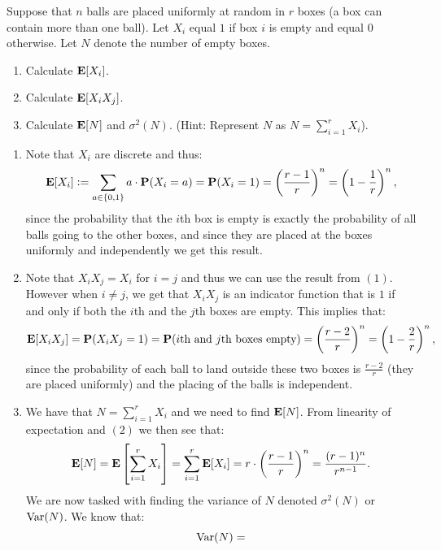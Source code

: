 \documentclass[11pt,a4paper]{article}
\begin{document}
\begin{exercise}
  Suppose that $n$ balls are placed uniformly at random in $r$ boxes
  (a box can contain more than one ball).
  Let $X_i$ equal $1$ if box $i$ is empty and equal $0$ otherwise.
  Let $N$ denote the number of empty boxes.
  \begin{enumerate}
    \item[(1)] Calculate $\mathbf{E}[X_i]$.
    \item[(2)] Calculate $\mathbf{E}[X_i X_j]$.
    \item[(3)] Calculate $\mathbf{E}[N]$ and $\sigma^2(N)$.
      (Hint: Represent $N$ as $N = \sum_{i=1}^{r} X_i$).
  \end{enumerate}
\end{exercise}
\begin{solution} \phantom{}
  \begin{enumerate}
    \item[(1)] Note that $X_i$ are discrete and thus:
      \[
        \E[X_i] :=
        \sum_{a \in \set{0,1}} a \cdot \Prob(X_i = a) =
        \Prob(X_i = 1) =
        \del{\frac{r - 1}{r}}^n =
        \del{1 - \frac{1}{r}}^n,
      \]
      since the probability that the $i$th box is empty is exactly
      the probability of all balls going to the other boxes,
      and since they are placed at the boxes uniformly and independently
      we get this result.
    \item[(2)] Note that $X_i X_j = X_i$ for $i = j$
      and thus we can use the result from $(1)$.
      However when $i \neq j$, we get that $X_i X_j$ is an indicator
      function that is $1$ if and only if both the $i$th and the $j$th
      boxes are empty.
      This implies that:
      \[
        \E[X_i X_j] = \Prob(X_i X_j = 1) = \Prob(\text{$i$th and $j$th boxes
        empty}) = 
        \del{\frac{r - 2}{r}}^n =
        \del{1 - \frac{2}{r}}^n,
      \]
      since the probability of each ball to land outside these two boxes
      is $\frac{r - 2}{r}$ (they are placed uniformly) and the placing
      of the balls is independent.
    \item[(3)] We have that $N = \sum_{i=1}^{r} X_i$
      and we need to find $\mathbf{E}[N]$.
      From linearity of expectation and $(2)$ we then see that:
      \[
        \E[N] =
        \E\left[\sum_{i=1}^{r} X_i\right] =
        \sum_{i=1}^{r} \E[X_i] = 
        r \cdot \del{\frac{r - 1}{r}}^n =
        \frac{(r - 1)^n}{r^{n-1}}.
      \]
      We are now tasked with finding the variance of $N$
      denoted $\sigma^2(N)$ or $\operatorname{Var}(N)$.
      We know that:
      \[
        \operatorname{Var}(N) =
\]
\end{enumerate}
\end{solution}
\end{document}
